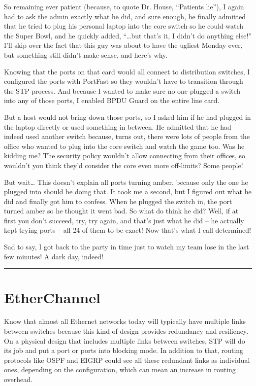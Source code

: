 So remaining ever patient (because, to quote Dr. House, ``Patients
lie''), I again had to ask the admin exactly what he did, and sure
enough, he finally admitted that he tried to plug his personal laptop
into the core switch so he could watch the Super Bowl, and he quickly
added, ``\ldots but that's it, I didn't do anything else!'' I'll skip
over the fact that this guy was about to have the ugliest Monday ever,
but something still didn't make sense, and here's why.

Knowing that the ports on that card would all connect to distribution
switches, I configured the ports with PortFast so they wouldn't have to
transition through the STP process. And because I wanted to make sure no
one plugged a switch into any of those ports, I enabled BPDU Guard on
the entire line card.

But a host would not bring down those ports, so I asked him if he had
plugged in the laptop directly or used something in between. He admitted
that he had indeed used another switch because, turns out, there were
lots of people from the office who wanted to plug into the core switch
and watch the game too. Was he kidding me? The security policy wouldn't
allow connecting from their offices, so wouldn't you think they'd
consider the core even more off-limits? Some people!

But wait\ldots{} This
doesn't explain all ports turning amber, because only the one he plugged
into should be doing that. It took me a second, but I figured out what
he did and finally got him to confess. When he plugged the switch in,
the port turned amber so he thought it went bad. So what do think he
did? Well, if at first you don't succeed, try, try again, and that's
just what he did -- he actually kept trying ports -- all 24 of them to be
exact! Now that's what I call determined!

Sad to say, I got back to the party in time just to watch my team lose
in the last few minutes! A dark day, indeed!

\begin{center}\rule{0.5\linewidth}{0.5pt}\end{center}



\section{EtherChannel}
\label{sec:etherchannel}

Know that almost all Ethernet networks today will typically have
multiple links between switches because this kind of design provides
redundancy and resiliency. On a physical design that includes multiple
links between switches, STP will do its job and put a port or ports into
blocking mode. In addition to that, routing protocols like OSPF and
EIGRP could see all these redundant links as individual ones, depending
on the configuration, which can mean an increase in routing overhead.

